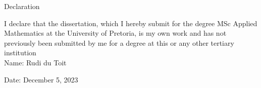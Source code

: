 \documentclass[main.tex]{subfiles}
\begin{document}
\newpage
\begin{center}
  {\Large Declaration}
\end{center}

I declare that the dissertation, which I hereby submit for the degree MSc Applied Mathematics at the University of Pretoria, is my own work and has not previously been submitted by me for a degree at this or any other tertiary institution\\

Name: Rudi du Toit

Date: December 5, 2023
\end{document}
